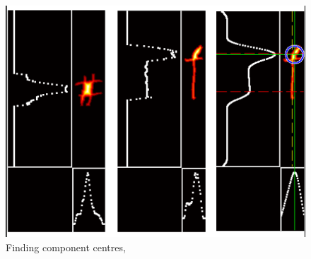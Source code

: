 \begin{figure}[H]
  \centering
  \includegraphics{gfx/prior-research/giloh-component-centre}
  \caption{Finding component centres, \parencite{benoptical}}
  \label{fig:giloh-component-centre}
\end{figure}

